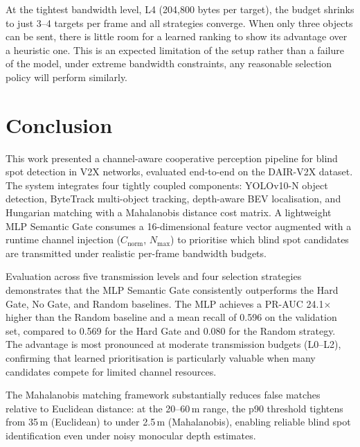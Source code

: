 \documentclass[12pt]{article}
\begin{document}
\medskip
At the tightest bandwidth level, L4 (204,800 bytes per target), the budget shrinks to just 3--4 targets per frame and all strategies converge. When only three objects can be sent, there is little room for a learned ranking to show its advantage over a heuristic one. This is an expected limitation of the setup rather than a failure of the model, under extreme bandwidth constraints, any reasonable selection policy will perform similarly.


\section{Conclusion}
 
This work presented a channel-aware cooperative perception pipeline for
blind spot detection in V2X networks, evaluated end-to-end on the
DAIR-V2X dataset.  The system integrates four tightly coupled
components: YOLOv10-N object detection, ByteTrack multi-object
tracking, depth-aware BEV localisation, and Hungarian matching with a
Mahalanobis distance cost matrix.  A lightweight MLP Semantic Gate
consumes a 16-dimensional feature vector augmented with a runtime
channel injection ($C_{\text{norm}}$, $N_{\max}$) to prioritise which
blind spot candidates are transmitted under realistic per-frame
bandwidth budgets.
 
\medskip
Evaluation across five transmission levels and four selection strategies
demonstrates that the MLP Semantic Gate consistently outperforms the
Hard Gate, No Gate, and Random baselines.  The MLP achieves a PR-AUC
24.1$\times$ higher than the Random baseline and a mean recall of 0.596
on the validation set, compared to 0.569 for the Hard Gate and 0.080
for the Random strategy.  The advantage is most pronounced at moderate
transmission budgets (L0--L2), confirming that learned prioritisation
is particularly valuable when many candidates compete for limited
channel resources.
 
\medskip
The Mahalanobis matching framework substantially reduces false matches
relative to Euclidean distance: at the 20--60\,m range, the p90
threshold tightens from 35\,m (Euclidean) to under 2.5\,m
(Mahalanobis), enabling reliable blind spot identification even under
noisy monocular depth estimates.
 
\end{document}
